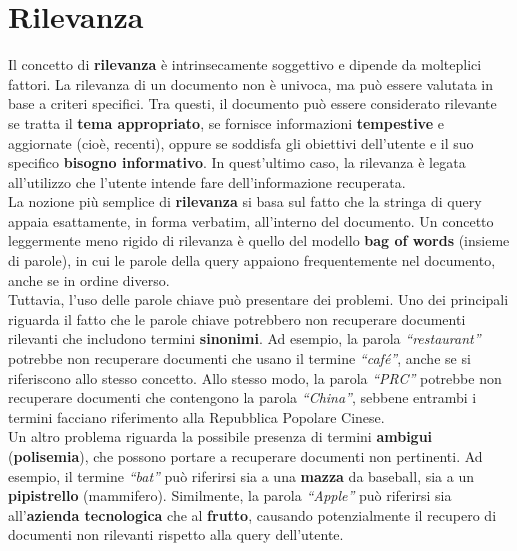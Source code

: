 \documentclass{report}
\begin{document}
	\section{Rilevanza}
	Il concetto di \textbf{rilevanza} è intrinsecamente soggettivo e dipende da molteplici fattori. La rilevanza di un documento non è univoca, ma può essere valutata in base a criteri specifici. Tra questi, il documento può essere considerato rilevante se tratta il \textbf{tema appropriato}, se fornisce informazioni \textbf{tempestive} e aggiornate (cioè, recenti), oppure se soddisfa gli obiettivi dell'utente e il suo specifico \textbf{bisogno informativo}. In quest'ultimo caso, la rilevanza è legata all'utilizzo che l'utente intende fare dell'informazione recuperata. 
	\vspace{\baselineskip}\\
	La nozione più semplice di \textbf{rilevanza} si basa sul fatto che la stringa di query appaia esattamente, in forma verbatim, all'interno del documento. Un concetto leggermente meno rigido di rilevanza è quello del modello \textbf{bag of words} (insieme di parole), in cui le parole della query appaiono frequentemente nel documento, anche se in ordine diverso. 
	\vspace{\baselineskip}\\
	Tuttavia, l'uso delle parole chiave può presentare dei problemi. Uno dei principali riguarda il fatto che le parole chiave potrebbero non recuperare documenti rilevanti che includono termini \textbf{sinonimi}. Ad esempio, la parola \textit{“restaurant”} potrebbe non recuperare documenti che usano il termine \textit{“café”}, anche se si riferiscono allo stesso concetto. Allo stesso modo, la parola \textit{“PRC”} potrebbe non recuperare documenti che contengono la parola \textit{“China”}, sebbene entrambi i termini facciano riferimento alla Repubblica Popolare Cinese. 
	\vspace{\baselineskip}\\
	Un altro problema riguarda la possibile presenza di termini \textbf{ambigui} (\textbf{polisemia}), che possono portare a recuperare documenti non pertinenti. Ad esempio, il termine \textit{“bat”} può riferirsi sia a una \textbf{mazza} da baseball, sia a un \textbf{pipistrello} (mammifero). Similmente, la parola \textit{“Apple”} può riferirsi sia all'\textbf{azienda tecnologica} che al \textbf{frutto}, causando potenzialmente il recupero di documenti non rilevanti rispetto alla query dell'utente.
\end{document}
